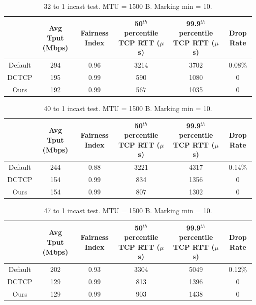 \begin{table}[!htb]
\begin{center}
\begin{tabular}{ |c|c|c|c|c|c| }
 \hline
  & Avg Tput (Mbps) & Fairness Index & 50$^{th}$ percentile TCP RTT ($\mu$s) & 99.9$^{th}$ percentile TCP RTT ($\mu$s) & Drop Rate \\
 \hline

 Default & 294 & 0.96 & 3214 & 3702 & 0.08\% \\
 DCTCP  & 195 & 0.99 & 590 & 1080 & 0 \\
 Ours & 192 & 0.99 &  567 & 1035 & 0 \\
 \hline
\end{tabular}
\caption{32 to 1 incast test. MTU = 1500 B. Marking min = 10.}
\label{incast_32to1_tbl_1500_markingMin10}
\end{center}
\end{table}

\begin{table}[!htb]
\begin{center}
\begin{tabular}{ |c|c|c|c|c|c| }
 \hline
  & Avg Tput (Mbps) & Fairness Index & 50$^{th}$ percentile TCP RTT ($\mu$s) & 99.9$^{th}$ percentile TCP RTT ($\mu$s) & Drop Rate \\
 \hline

 Default & 244 & 0.88 & 3221 & 4317 & 0.14\% \\
 DCTCP  & 154 & 0.99 & 834 & 1356 & 0 \\
 Ours & 154 & 0.99 &  807 & 1302 & 0 \\
 \hline
\end{tabular}
\caption{40 to 1 incast test. MTU = 1500 B. Marking min = 10.}
\label{incast_40to1_tbl_1500_markingMin10}
\end{center}
\end{table}


\begin{table}[!htb]
\begin{center}
\begin{tabular}{ |c|c|c|c|c|c| }
 \hline
  & Avg Tput (Mbps) & Fairness Index & 50$^{th}$ percentile TCP RTT ($\mu$s) & 99.9$^{th}$ percentile TCP RTT ($\mu$s) & Drop Rate \\
 \hline

 Default & 202 & 0.93 & 3304 & 5049 & 0.12\% \\
 DCTCP  & 129 & 0.99 & 813 & 1396 & 0 \\
 Ours & 129 & 0.99 &  903 & 1438 & 0 \\
 \hline
\end{tabular}
\caption{47 to 1 incast test. MTU = 1500 B. Marking min = 10.}
\label{incast_47to1_tbl_1500_markingMin10}
\end{center}
\end{table}


